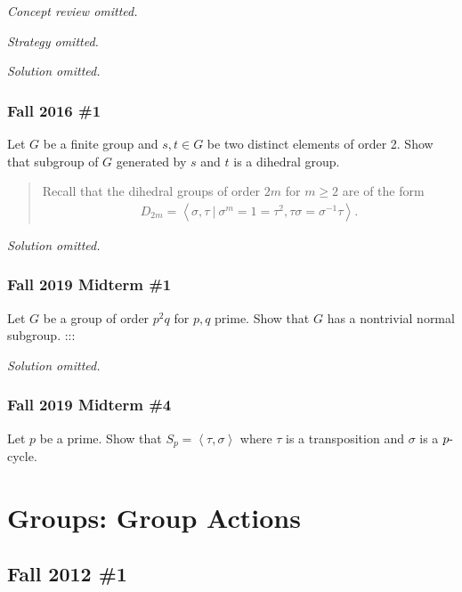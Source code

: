\emph{Concept review omitted.}

\emph{Strategy omitted.}

\emph{Solution omitted.}

\hypertarget{fall-2016-1}{%
\subsubsection{Fall 2016 \#1}\label{fall-2016-1}}

Let \(G\) be a finite group and \(s, t\in G\) be two distinct elements
of order 2. Show that subgroup of \(G\) generated by \(s\) and \(t\) is
a dihedral group.

\begin{quote}
Recall that the dihedral groups of order \(2m\) for \(m\geq 2\) are of
the form
\begin{align*}
D_{2m} = \left\langle{\sigma, \tau {~\mathrel{\Big\vert}~}\sigma^m = 1 = \tau^2, \tau \sigma = \sigma^{-1}\tau}\right\rangle
.\end{align*}
\end{quote}

\emph{Solution omitted.}

\hypertarget{fall-2019-midterm-1}{%
\subsubsection{Fall 2019 Midterm \#1}\label{fall-2019-midterm-1}}

Let \(G\) be a group of order \(p^2q\) for \(p, q\) prime. Show that
\(G\) has a nontrivial normal subgroup. :::

\emph{Solution omitted.}

\hypertarget{fall-2019-midterm-4}{%
\subsubsection{Fall 2019 Midterm \#4}\label{fall-2019-midterm-4}}

Let \(p\) be a prime. Show that
\(S_p = \left\langle{\tau, \sigma}\right\rangle\) where \(\tau\) is a
transposition and \(\sigma\) is a \(p{\hbox{-}}\)cycle.

\hypertarget{groups-group-actions}{%
\section{Groups: Group Actions}\label{groups-group-actions}}

\hypertarget{fall-2012-1}{%
\subsection{Fall 2012 \#1}\label{fall-2012-1}}

